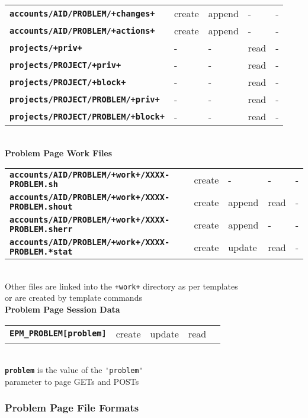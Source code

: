\documentclass[12pt]{article}
\newcommand{\TT}[1]{{\tt \bfseries #1}}
\begin{document}
\begin{center}
\begin{tabular}{lllll}
\TT{accounts/AID/PROBLEM/+changes+}	& create  & append & - & - \\
\TT{accounts/AID/PROBLEM/+actions+}	& create  & append & - & - \\
\TT{projects/+priv+}			& -  & - & read & - \\
\TT{projects/PROJECT/+priv+}		& -  & - & read & - \\
\TT{projects/PROJECT/+block+}		& -  & - & read & - \\
\TT{projects/PROJECT/PROBLEM/+priv+}	& -  & - & read & - \\
\TT{projects/PROJECT/PROBLEM/+block+}	& -  & - & read & - \\
\end{tabular}
\\\bigskip
{\bf Problem Page Work Files}
\\[1ex]
\begin{tabular}{lllll}
\TT{accounts/AID/PROBLEM/+work+/XXXX-PROBLEM.sh}     & create  & - & - & - \\
\TT{accounts/AID/PROBLEM/+work+/XXXX-PROBLEM.shout}  & create  & append & read
                                                                        & - \\
\TT{accounts/AID/PROBLEM/+work+/XXXX-PROBLEM.sherr}  & create  & append & -
                                                                        & - \\
\TT{accounts/AID/PROBLEM/+work+/XXXX-PROBLEM.*stat}  & create  & update & read
                                                                        & - \\
\end{tabular}
\\[2ex]
Other files are linked into the {\tt +work+} directory
as per templates \\
or are created by template commands
\\[3ex]
{\bf Problem Page Session Data}
\\[1ex]
\begin{tabular}{lllll}
\TT{EPM\_PROBLEM[problem]}
		& create  & update & read \\
\end{tabular}
\\[3ex]
\TT{problem} is the value of the \verb|'problem'| \\
parameter to page GETs and POSTs
\end{center}

\subsubsection{Problem Page File Formats}
\end{document}
